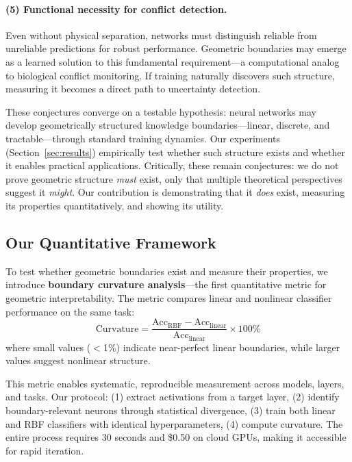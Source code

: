 \documentclass[11pt]{article}
\begin{document}
\paragraph{(5) Functional necessity for conflict detection.} Even without physical separation, networks must distinguish reliable from unreliable predictions for robust performance. Geometric boundaries may emerge as a learned solution to this fundamental requirement---a computational analog to biological conflict monitoring. If training naturally discovers such structure, measuring it becomes a direct path to uncertainty detection.

These conjectures converge on a testable hypothesis: neural networks may develop geometrically structured knowledge boundaries---linear, discrete, and tractable---through standard training dynamics. Our experiments (Section~\ref{sec:results}) empirically test whether such structure exists and whether it enables practical applications. Critically, these remain conjectures: we do not prove geometric structure \textit{must} exist, only that multiple theoretical perspectives suggest it \textit{might}. Our contribution is demonstrating that it \textit{does} exist, measuring its properties quantitatively, and showing its utility.

\subsection{Our Quantitative Framework}
\label{sec:intro-framework}

To test whether geometric boundaries exist and measure their properties, we introduce \textbf{boundary curvature analysis}---the first quantitative metric for geometric interpretability. The metric compares linear and nonlinear classifier performance on the same task:
\begin{equation}
\text{Curvature} = \frac{\text{Acc}_{\text{RBF}} - \text{Acc}_{\text{linear}}}{\text{Acc}_{\text{linear}}} \times 100\%
\end{equation}
where small values ($<$1\%) indicate near-perfect linear boundaries, while larger values suggest nonlinear structure.

This metric enables systematic, reproducible measurement across models, layers, and tasks. Our protocol: (1) extract activations from a target layer, (2) identify boundary-relevant neurons through statistical divergence, (3) train both linear and RBF classifiers with identical hyperparameters, (4) compute curvature. The entire process requires 30 seconds and \$0.50 on cloud GPUs, making it accessible for rapid iteration.
\end{document}

